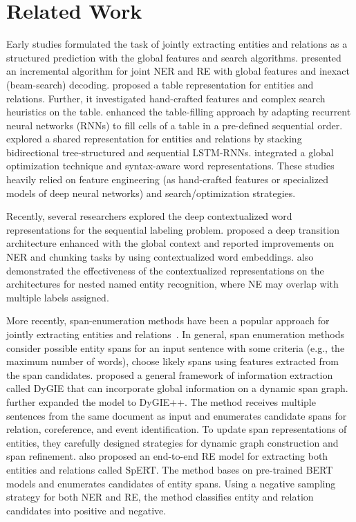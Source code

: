 \documentclass[11pt,a4paper]{article}
\begin{document}
\section{Related Work}
\label{related work}



Early studies formulated the task of jointly extracting entities and relations as a structured prediction with the global features and search algorithms.
\citet{li-ji-2014-incremental} presented an incremental algorithm for joint NER and RE with global features and inexact (beam-search) decoding.
\citet{miwa-sasaki-2014-modeling} proposed a table representation for entities and relations. Further, it investigated hand-crafted features and complex search heuristics on the table.
\citet{gupta-etal-2016-table} enhanced the table-filling approach by adapting recurrent neural networks (RNNs) to fill cells of a table in a pre-defined sequential order.
\citet{miwa-bansal-2016-end} explored a shared representation for entities and relations by stacking bidirectional tree-structured and sequential LSTM-RNNs.
\citet{zhang-etal-2017-end} integrated a global optimization technique and syntax-aware word representations.
These studies heavily relied on feature engineering (as hand-crafted features or specialized models of deep neural networks) and search/optimization strategies.

Recently, several researchers explored the deep contextualized word representations for the sequential labeling problem.
\citet{liu-etal-2019-gcdt} proposed a deep transition architecture enhanced with the global context and reported improvements on NER and chunking tasks by using contextualized word embeddings.
\citet{strakova-etal-2019-neural} also demonstrated the effectiveness of the contextualized representations on the architectures for nested named entity recognition, where NE may overlap with multiple labels assigned.

More recently, span-enumeration methods have been a popular approach for jointly extracting entities and relations~\cite{luan-etal-2019-general,Wadden2019EntityRA,spert}.
In general, span enumeration methods consider possible entity spans for an input sentence with some criteria (e.g., the maximum number of words), choose likely spans using features extracted from the span candidates.
\citet{luan-etal-2019-general} proposed a general framework of information extraction called DyGIE that can incorporate global information on a dynamic span graph. \citet{Wadden2019EntityRA} further expanded the model to DyGIE++. The method receives multiple sentences from the same document as input and enumerates candidate spans for relation, coreference, and event identification. To update span representations of entities, they carefully designed strategies for dynamic graph construction and span refinement.
\citet{spert} also proposed an end-to-end RE model for extracting both entities and relations called SpERT. The method bases on pre-trained BERT models and enumerates candidates of entity spans. Using a negative sampling strategy for both NER and RE, the method classifies entity and relation candidates into positive and negative.
\end{document}
